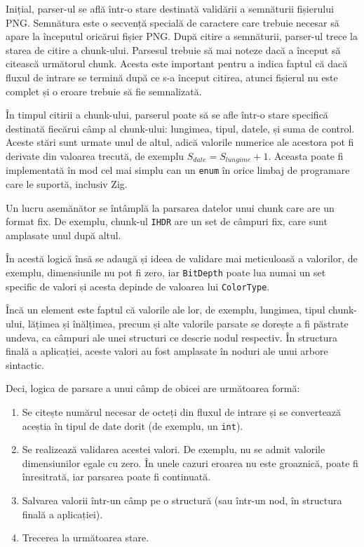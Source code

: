 \documentclass[a4paper,12pt]{report}
\begin{document}
Inițial, parser-ul se află într-o stare destinată validării a semnăturii fișierului \ac{PNG}.
Semnătura este o secvență specială de caractere care 
trebuie necesar să apare la începutul oricărui fișier \ac{PNG}.
După citire a semnăturii, parser-ul trece la starea de citire a chunk-ului.
Parsesul trebuie să mai noteze dacă a început să citească următorul chunk.
Acesta este important pentru a indica faptul că dacă fluxul de intrare
se termină după ce s-a început citirea, atunci fișierul nu este complet și 
o eroare trebuie să fie semnalizată.

În timpul citirii a chunk-ului, parserul poate să se afle 
într-o stare specifică destinată fiecărui câmp al chunk-ului:
lungimea, tipul, datele, și suma de control.
Aceste stări sunt urmate unul de altul, adică valorile numerice
ale acestora pot fi derivate din valoarea trecută, de exemplu 
$ S_{date} = S_{lungime} + 1. $
Aceasta poate fi implementată în mod cel mai simplu can un \texttt{enum}
în orice limbaj de programare care le suportă, inclusiv Zig.

Un lucru asemănător se întâmplă la parsarea datelor unui chunk care are un format fix.
De exemplu, chunk-ul \texttt{IHDR} are un set de câmpuri fix, care sunt amplasate unul după altul.

În acestă logică însă se adaugă și ideea de validare mai meticuloasă a valorilor,
de exemplu, dimensiunile nu pot fi zero, iar \texttt{BitDepth} poate lua numai un set specific de valori
și acesta depinde de valoarea lui \texttt{ColorType}.

Încă un element este faptul că valorile ale lor, de exemplu, lungimea, tipul chunk-ului,
lățimea și înălțimea, precum și alte valorile parsate se dorește a fi păstrate undeva,
ca câmpuri ale unei structuri ce descrie nodul respectiv.
În structura finală a aplicației, aceste valori au fost amplasate în noduri ale unui arbore sintactic.

Deci, logica de parsare a unui câmp de obicei are următoarea formă:
\begin{enumerate}
\item
    Se citește numărul necesar de octeți din fluxul de intrare
    și se convertează aceștia în tipul de date dorit (de exemplu, un \texttt{int}).
\item
    Se realizează validarea acestei valori.
    De exemplu, nu se admit valorile dimensiunilor egale cu zero.
    În unele cazuri eroarea nu este groaznică, poate fi înresitrată, iar parsarea poate fi continuată.
\item
    Salvarea valorii într-un câmp pe o structură (sau într-un nod, în structura finală a aplicației).
\item
    Trecerea la următoarea stare.
\end{enumerate}
\end{document}
